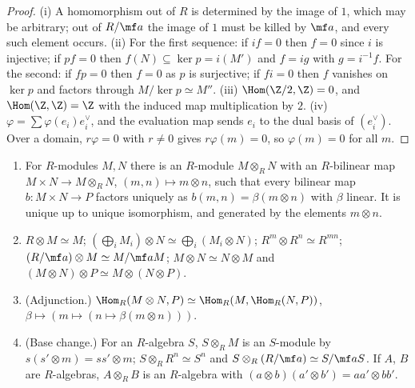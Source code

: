 \begin{proof}
(i) A homomorphism out of $R$ is determined by the image of $1$, which may be arbitrary; out of $R/\mf a$ the image of $1$
must be killed by $\mf a$, and every such element occurs. (ii) For the first sequence: if $if=0$ then $f=0$ since $i$ is
injective; if $pf=0$ then $f(N)\subseteq\ker p=i(M')$ and $f=ig$ with $g=i^{-1}f$. For the second: if $fp=0$ then $f=0$ as $p$ is
surjective; if $fi=0$ then $f$ vanishes on $\ker p$ and factors through $M/\ker p\simeq M''$. (iii) $\Hom(\Z/2,\Z)=0$, and
$\Hom(\Z,\Z)=\Z$ with the induced map multiplication by $2$. (iv) $\varphi=\sum\varphi(e_i)e_i^\vee$, and the evaluation map sends $e_i$ to
the dual basis of $(e_i^\vee)$. Over a domain, $r\varphi=0$ with $r\ne0$ gives $r\varphi(m)=0$, so $\varphi(m)=0$ for all $m$.
\end{proof}

\begin{theorem}\label{thm:modules:tensor}
\begin{enumerate}[label=(\roman*)]
\item For $R$-modules $M,N$ there is an $R$-module $M\otimes_RN$ with an $R$-bilinear map $M\times N\to M\otimes_RN$,
$(m,n)\mapsto m\otimes n$, such that every bilinear map $b\colon M\times N\to P$ factors uniquely as $b(m,n)=\beta(m\otimes n)$ with
$\beta$ linear. It is unique up to unique isomorphism, and generated by the elements $m\otimes n$.
\item $R\otimes M\simeq M$; $(\bigoplus_iM_i)\otimes N\simeq\bigoplus_i(M_i\otimes N)$; $R^m\otimes R^n\simeq R^{mn}$; $(R/\mf a)\otimes M\simeq M/\mf aM$;
$M\otimes N\simeq N\otimes M$ and $(M\otimes N)\otimes P\simeq M\otimes(N\otimes P)$.
\item (Adjunction.) $\Hom_R(M\otimes N,P)\simeq\Hom_R(M,\Hom_R(N,P))$, $\beta\mapsto(m\mapsto(n\mapsto\beta(m\otimes n)))$.
\item (Base change.) For an $R$-algebra $S$, $S\otimes_RM$ is an $S$-module by $s(s'\otimes m)=ss'\otimes m$; $S\otimes_RR^n\simeq S^n$ and
$S\otimes_R(R/\mf a)\simeq S/\mf aS$. If $A$, $B$ are $R$-algebras, $A\otimes_RB$ is an $R$-algebra with $(a\otimes b)(a'\otimes b')=aa'\otimes bb'$.
\end{enumerate}
\end{theorem}

